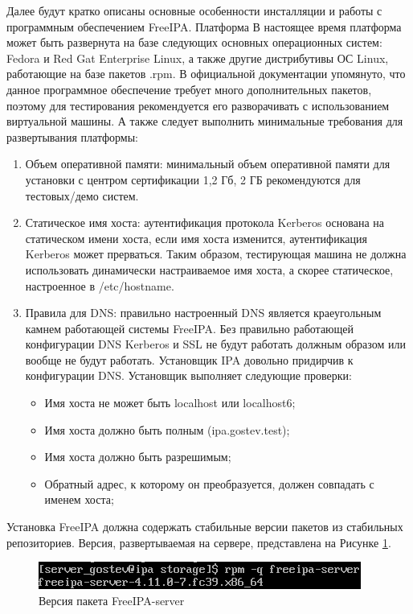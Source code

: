 \documentclass[14pt, a4paper]{extarticle}
\numberwithin{equation}{section}
\begin{document}
Далее будут кратко описаны основные особенности инсталляции и работы с программным обеспечением FreeIPA. 
Платформа В настоящее время платформа может быть развернута на базе следующих основных операционных систем: 
Fedora и Red Gat Enterprise Linux, а также другие дистрибутивы ОС Linux, работающие на базе пакетов .rpm. 
В официальной документации упомянуто, что данное программное обеспечение требует много дополнительных 
пакетов, поэтому для тестирования рекомендуется его разворачивать с использованием виртуальной машины. 
А также следует выполнить минимальные требования для развертывания платформы: 
\begin{enumerate}
        \item Объем оперативной памяти: 
        минимальный объем оперативной памяти для установки с центром сертификации 1,2 Гб, 2 ГБ 
        рекомендуются для тестовых/демо систем. 
        \item Статическое имя хоста: аутентификация протокола Kerberos основана на 
        статическом имени хоста, если имя хоста изменится, аутентификация Kerberos может прерваться. 
        Таким образом, тестирующая машина не должна использовать динамически настраиваемое имя хоста, 
        а скорее статическое, настроенное в /etc/hostname. 
        \item Правила для DNS: правильно настроенный DNS является краеугольным камнем работающей системы FreeIPA. 
        Без правильно работающей конфигурации DNS Kerberos и SSL не будут работать должным образом или вообще не будут работать. 
        Установщик IPA довольно придирчив к конфигурации DNS. Установщик выполняет следующие проверки: 
        \begin{itemize}
                \item Имя хоста не может быть localhost или localhost6;
                \item Имя хоста должно быть полным (ipa.gostev.test); 
                \item Имя хоста должно быть разрешимым;
                \item Обратный адрес, к которому он преобразуется, должен совпадать с именем хоста; 

        \end{itemize}
\end{enumerate}

Установка FreeIPA должна содержать стабильные версии пакетов из стабильных репозиториев.
Версия, развертываемая на сервере, представлена на Рисунке \ref{fig:freeipa_server_version}. 
\begin{figure}[H]
        \centering
        \includegraphics[scale=1.4]{freeipa_server_version.png}
        \caption{Версия пакета FreeIPA-server}
        \label{fig:freeipa_server_version}
\end{figure}
\end{document}
